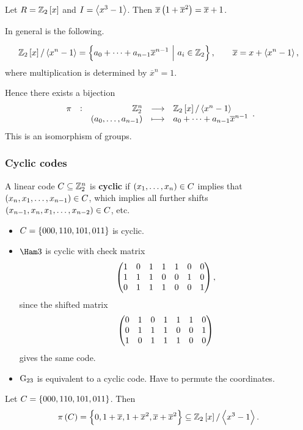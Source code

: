 \begin{example*}
Let $ R = \ZZ_2\sbr{x} $ and $ I = \left\langle x^3 - 1 \right\rangle $. Then $ \overline{x}\br{1 + \overline{x}^2} = \overline{x} + 1 $.
\end{example*}

In general is the following.

\begin{proposition}
$$ \ZZ_2\sbr{x} / \abr{x^n - 1} = \cbr{a_0 + \dots + a_{n - 1}\overline{x}^{n - 1} \st a_i \in \ZZ_2}, \qquad \overline{x} = x + \abr{x^n - 1}, $$
where multiplication is determined by $ \overline{x}^n = 1 $.
\end{proposition}

Hence there exists a bijection
$$ \function[\pi]{\ZZ_2^n}{\ZZ_2\sbr{x} / \abr{x^n - 1}}{\br{a_0, \dots, a_{n - 1}}}{a_0 + \dots + a_{n - 1}\overline{x}^{n - 1}}. $$
This is an isomorphism of groups.

\subsubsection{Cyclic codes}

\begin{definition*}
A linear code $ C \subseteq \mathbb{Z}_2^n $ is \textbf{cyclic} if $ \br{x_1, \dots, x_n} \in C $ implies that $ \br{x_n, x_1, \dots, x_{n - 1}} \in C $, which implies all further shifts $ \br{x_{n - 1}, x_n, x_1, \dots, x_{n - 2}} \in C $, etc.
\end{definition*}

\begin{example*}
\hfill
\begin{itemize}
\item $ C = \cbr{000, 110, 101, 011} $ is cyclic.
\item $ \Ham 3 $ is cyclic with check matrix
$$ \begin{pmatrix} 1 & 0 & 1 & 1 & 1 & 0 & 0 \\ 1 & 1 & 1 & 0 & 0 & 1 & 0 \\ 0 & 1 & 1 & 1 & 0 & 0 & 1 \end{pmatrix}, $$
since the shifted matrix
$$ \begin{pmatrix} 0 & 1 & 0 & 1 & 1 & 1 & 0 \\ 0 & 1 & 1 & 1 & 0 & 0 & 1 \\ 1 & 0 & 1 & 1 & 1 & 0 & 0 \end{pmatrix} $$
gives the same code.
\item $ \mathrm{G}_{23} $ is equivalent to a cyclic code. Have to permute the coordinates.
\end{itemize}
\end{example*}

\begin{example*}
Let $ C = \cbr{000, 110, 101, 011} $. Then
$$ \pi\br{C} = \cbr{0, 1 + \overline{x}, 1 + \overline{x}^2, \overline{x} + \overline{x}^2} \subseteq \ZZ_2\sbr{x} / \abr{x^3 - 1}. $$
\end{example*}

